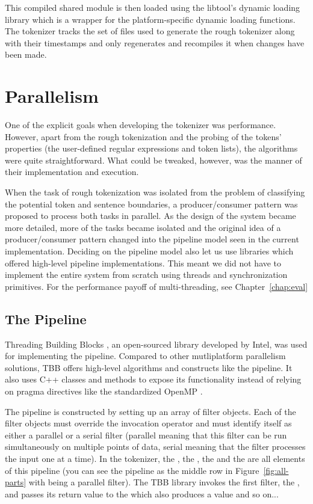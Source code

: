 This compiled shared module is then loaded using the libtool's dynamic loading
library \cite{web-libtool} which is a wrapper for the platform-specific dynamic
loading functions. The tokenizer tracks the set of files used to generate the
rough tokenizer along with their timestamps and only regenerates and recompiles
it when changes have been made.

\section{Parallelism}
\label{sec:impl-parallel}

One of the explicit goals when developing the tokenizer was performance.
However, apart from the rough tokenization and the probing of the tokens'
properties (the user-defined regular expressions and token lists), the
algorithms were quite straightforward. What could be tweaked, however, was the
manner of their implementation and execution. 

When the task of rough tokenization was isolated from the problem of
classifying the potential token and sentence boundaries, a producer/consumer
pattern was proposed to process both tasks in parallel. As the design of the
system became more detailed, more of the tasks became isolated and the original
idea of a producer/consumer pattern changed into the pipeline model seen in the
current implementation. Deciding on the pipeline model also let us use
libraries which offered high-level pipeline implementations. This meant we did
not have to implement the entire system from scratch using threads and
synchronization primitives. For the performance payoff of multi-threading, see
Chapter~\ref{chap:eval}

\subsection{The Pipeline}
\label{ssec:impl-parallel-pipeline}

Threading Building Blocks \cite{web-tbb}, an open-sourced library developed by
Intel, was used for implementing the pipeline. Compared to other mutliplatform
parallelism solutions, TBB offers high-level algorithms and constructs like the
pipeline. It also uses C++ classes and methods to expose its functionality
instead of relying on pragma directives like the standardized OpenMP
\cite{web-openmp}. 

The pipeline is constructed by setting up an array of filter objects. Each of
the filter objects must override the invocation operator and must identify
itself as either a parallel or a serial filter (parallel meaning that this
filter can be run simultaneously on multiple points of data, serial meaning
that the filter processes the input one at a time). In the tokenizer, the
, the , the 
and the  are all elements of this pipeline (you can see
the pipeline as the middle row in Figure~\ref{fig:all-parts} with
 being a parallel filter). The TBB library invokes the
first filter, the , and passes its return value to the
 which also produces a value and so on...

